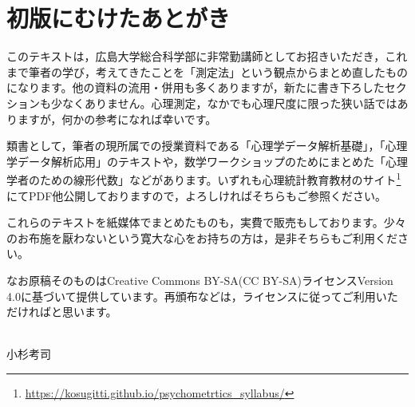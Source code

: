 
\section*{初版にむけたあとがき}

このテキストは，広島大学総合科学部に非常勤講師としてお招きいただき，これまで筆者の学び，考えてきたことを「測定法」という観点からまとめ直したものになります。他の資料の流用・併用も多くありますが，新たに書き下ろしたセクションも少なくありません。心理測定，なかでも心理尺度に限った狭い話ではありますが，何かの参考になれば幸いです。

類書として，筆者の現所属での授業資料である「心理学データ解析基礎」，「心理学データ解析応用」のテキストや，数学ワークショップのためにまとめた「心理学者のための線形代数」などがあります。いずれも心理統計教育教材のサイト\footnote{\url{https://kosugitti.github.io/psychometrtics_syllabus/}}にてPDF他公開しておりますので，よろしければそちらもご参照ください。

これらのテキストを紙媒体でまとめたものも，実費で販売もしております。少々のお布施を厭わないという寛大な心をお持ちの方は，是非そちらもご利用ください。


なお原稿そのものはCreative Commons BY-SA(CC BY-SA)ライセンスVersion 4.0に基づいて提供しています。再頒布などは，ライセンスに従ってご利用いただければと思います。

\begin{flushright}
    \date{\today}\\
    小杉考司
\end{flushright}

